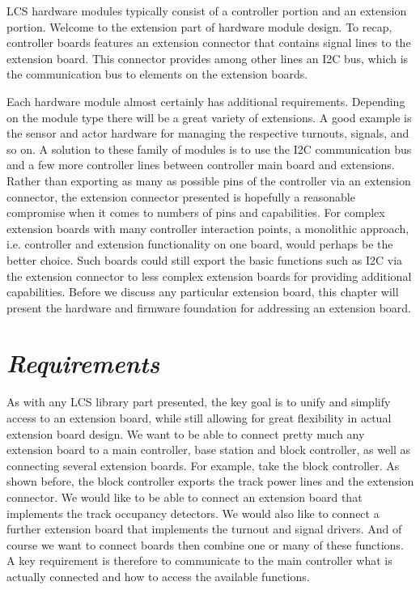 
LCS hardware modules typically consist of a controller portion and an extension portion. Welcome to the extension part of hardware module design. To recap, controller boards features an extension connector that contains signal lines to the extension board. This connector provides among other lines an I2C bus, which is the communication bus to elements on the extension boards.

Each hardware module almost certainly has additional requirements. Depending on the module type there will be a great variety of extensions. A good example is the sensor and actor hardware for managing the respective turnouts, signals, and so on. A solution to these family of modules is to use the I2C communication bus and a few more controller lines between controller main board and extensions. Rather than exporting as many as possible pins of the controller via an extension connector, the extension connector presented is hopefully a reasonable compromise when it comes to numbers of pins and capabilities. For complex extension boards with many controller interaction points, a monolithic approach, i.e. controller and extension functionality on one board, would perhaps be the better choice. Such boards could still export the basic functions such as I2C via the extension connector to less complex extension boards for providing additional capabilities. Before we discuss any particular extension board, this chapter will present the hardware and firmware foundation for addressing an extension board.

\section{\textit{Requirements}}

As with any LCS library part presented, the key goal is to unify and simplify access to an extension board, while still allowing for great flexibility in actual extension board design. We want to be able to connect pretty much any extension board to a main controller, base station and block controller, as well as connecting several extension boards. For example, take the block controller. As shown before, the block controller exports the track power lines and the extension connector. We would like to be able to connect an extension board that implements the track occupancy detectors. We would also like to connect a further extension board that implements the turnout and signal drivers. And of course we want to connect boards then combine one or many of these functions. A key requirement is therefore to communicate to the main controller what is actually connected and how to access the available functions.

